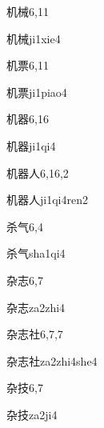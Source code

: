 \begin{entry}{机械}{6,11}
  \begin{phonetics}{机械}{ji1xie4}
  \end{phonetics}
\end{entry}

\begin{entry}{机票}{6,11}
  \begin{phonetics}{机票}{ji1piao4}
  \end{phonetics}
\end{entry}

\begin{entry}{机器}{6,16}
  \begin{phonetics}{机器}{ji1qi4}
  \end{phonetics}
\end{entry}

\begin{entry}{机器人}{6,16,2}
  \begin{phonetics}{机器人}{ji1qi4ren2}
  \end{phonetics}
\end{entry}

\begin{entry}{杀气}{6,4}
  \begin{phonetics}{杀气}{sha1qi4}
  \end{phonetics}
\end{entry}

\begin{entry}{杂志}{6,7}
  \begin{phonetics}{杂志}{za2zhi4}
  \end{phonetics}
\end{entry}

\begin{entry}{杂志社}{6,7,7}
  \begin{phonetics}{杂志社}{za2zhi4she4}
  \end{phonetics}
\end{entry}

\begin{entry}{杂技}{6,7}
  \begin{phonetics}{杂技}{za2ji4}
  \end{phonetics}
\end{entry}

